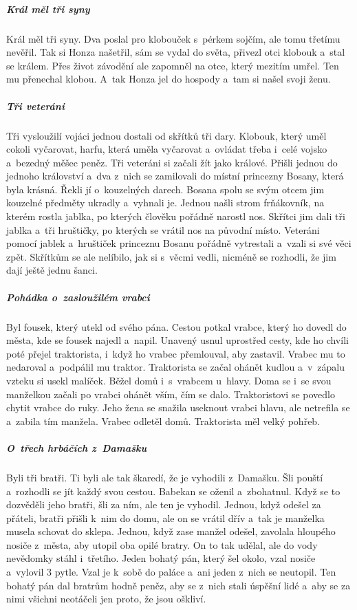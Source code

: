 {{\subparagraph{Král měl tři syny}
	Král měl tři syny. Dva poslal pro klobouček s~pérkem sojčím, ale tomu
	třetímu nevěřil. Tak si Honza našetřil, sám se vydal do světa, přivezl otci
	klobouk a~stal se králem. Přes život závodění ale zapomněl na otce, který
	mezitím umřel. Ten mu přenechal klobou. A~tak Honza jel do hospody a~tam si
	našel svoji ženu.

\subparagraph{Tři veteráni}
	Tři vysloužilí vojáci jednou dostali od skřítků tři dary. Klobouk, který
	uměl cokoli vyčarovat, harfu, která uměla vyčarovat a~ovládat třeba i~celé
	vojsko a~bezedný měšec peněz. Tři veteráni si začali žít jako králové.
	Přišli jednou do jednoho království a~dva z~nich se zamilovali do místní
	princezny Bosany, která byla krásná. Řekli jí o~kouzelných darech. Bosana
	spolu se svým otcem jim kouzelné předměty ukradly a~vyhnali je. Jednou
	našli strom frňákovník, na kterém rostla jablka, po kterých člověku pořádně
	narostl nos. Skřítci jim dali tři jablka a~tři hruštičky, po kterých se
	vrátil nos na původní místo. Veteráni pomocí jablek a~hruštiček princeznu
	Bosanu pořádně vytrestali a~vzali si své věci zpět. Skřítkům se ale
	nelíbilo, jak si s~věcmi vedli, nicméně se rozhodli, že jim dají ještě
	jednu šanci.

\subparagraph{Pohádka o~zasloužilém vrabci}
	Byl fousek, který utekl od svého pána. Cestou potkal vrabce, který ho
	dovedl do města, kde se fousek najedl a~napil. Unavený usnul uprostřed
	cesty, kde ho chvíli poté přejel traktorista, i~když ho vrabec přemlouval,
	aby zastavil. Vrabec mu to nedaroval a~podpálil mu traktor. Traktorista se
	začal ohánět kudlou a~v~zápalu vzteku si usekl malíček. Běžel domů
	i~s~vrabcem u~hlavy. Doma se i~se svou  manželkou začali po
	vrabci ohánět vším, čím se dalo. Traktoristovi se povedlo chytit vrabce do
	ruky. Jeho žena se snažila useknout vrabci hlavu, ale netrefila se a~zabila
	tím manžela. Vrabec odletěl domů. Traktorista měl velký pohřeb.

\subparagraph{O~třech hrbáčích z~Damašku}
	Byli tři bratři. Ti byli ale tak škaredí, že je vyhodili z~Damašku. Šli
	pouští a~rozhodli se jít každý svou cestou. Babekan se oženil a~zbohatnul.
	Když se to dozvěděli jeho bratři, šli za ním, ale ten je vyhodil. Jednou,
	když odešel za přáteli, bratři přišli k~nim do domu, ale on se vrátil dřív
	a~tak je manželka musela schovat do sklepa. Jednou, když zase manžel
	odešel, zavolala hloupého nosiče z~města, aby utopil oba opilé bratry. On
	to tak udělal, ale do vody nevědomky stáhl i~třetího. Jeden bohatý pán,
	který šel okolo, vzal nosiče a~vylovil 3 pytle. Vzal je k~sobě do paláce
	a~ani jeden z~nich se neutopil. Ten bohatý pán dal bratrům hodně peněz, aby
	se z~nich stali úspěšní lidé a~aby se za nimi všichni neotáčeli jen proto,
	že jsou oškliví.

}}
